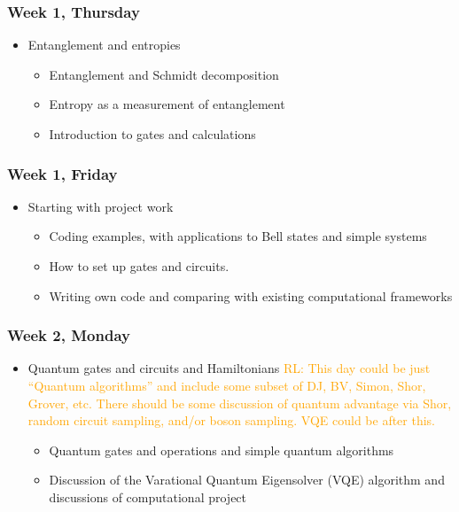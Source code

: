 \documentclass[twocolumn,superscriptaddress,amsmath,amssymb,
aps,floatfix]{revtex4-2}
\begin{document}
    \subsubsection{Week 1, Thursday}\label{week-1-thursday}

\begin{itemize}
\item
  Entanglement and entropies

  \begin{itemize}
  \item
    Entanglement and Schmidt decomposition
  \item
    Entropy as a measurement of entanglement
  \item
    Introduction to gates and calculations
  \end{itemize}
\end{itemize}

    \subsubsection{Week 1, Friday}\label{week-1-friday}

\begin{itemize}
\item
  Starting with project work

  \begin{itemize}
  \item
    Coding examples, with applications to Bell states and simple
    systems
  \item
    How to set up gates and circuits.
  \item
    Writing own code and comparing with existing computational
    frameworks
  \end{itemize}
\end{itemize}

    \subsubsection{Week 2, Monday}\label{week-2-monday}

\begin{itemize}
\item
  Quantum gates and circuits and Hamiltonians
    \textcolor{orange}{RL: This day could be just ``Quantum algorithms'' and include some subset of DJ, BV, Simon, Shor, Grover, etc. There should be some discussion of quantum advantage via Shor, random circuit sampling, and/or boson sampling. VQE could be after this.}

  \begin{itemize}
  \item
    Quantum gates and operations and simple quantum algorithms
  \item
    Discussion of the Varational Quantum Eigensolver (VQE) algorithm and
    discussions of computational project
  \end{itemize}
\end{itemize}
\end{document}
